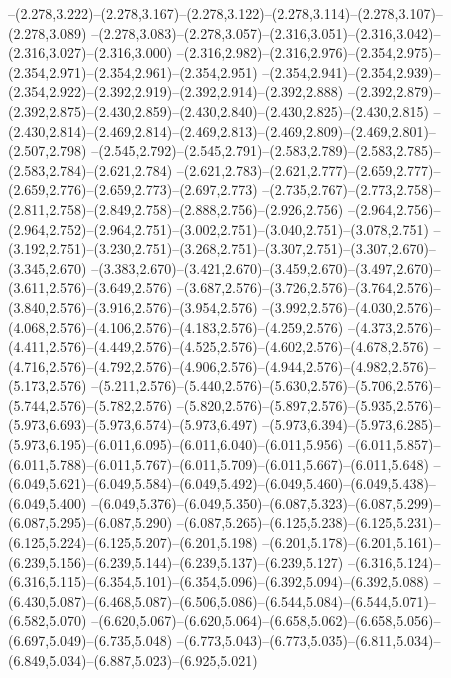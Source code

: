   --(2.278,3.222)--(2.278,3.167)--(2.278,3.122)--(2.278,3.114)--(2.278,3.107)--(2.278,3.089)%
  --(2.278,3.083)--(2.278,3.057)--(2.316,3.051)--(2.316,3.042)--(2.316,3.027)--(2.316,3.000)%
  --(2.316,2.982)--(2.316,2.976)--(2.354,2.975)--(2.354,2.971)--(2.354,2.961)--(2.354,2.951)%
  --(2.354,2.941)--(2.354,2.939)--(2.354,2.922)--(2.392,2.919)--(2.392,2.914)--(2.392,2.888)%
  --(2.392,2.879)--(2.392,2.875)--(2.430,2.859)--(2.430,2.840)--(2.430,2.825)--(2.430,2.815)%
  --(2.430,2.814)--(2.469,2.814)--(2.469,2.813)--(2.469,2.809)--(2.469,2.801)--(2.507,2.798)%
  --(2.545,2.792)--(2.545,2.791)--(2.583,2.789)--(2.583,2.785)--(2.583,2.784)--(2.621,2.784)%
  --(2.621,2.783)--(2.621,2.777)--(2.659,2.777)--(2.659,2.776)--(2.659,2.773)--(2.697,2.773)%
  --(2.735,2.767)--(2.773,2.758)--(2.811,2.758)--(2.849,2.758)--(2.888,2.756)--(2.926,2.756)%
  --(2.964,2.756)--(2.964,2.752)--(2.964,2.751)--(3.002,2.751)--(3.040,2.751)--(3.078,2.751)%
  --(3.192,2.751)--(3.230,2.751)--(3.268,2.751)--(3.307,2.751)--(3.307,2.670)--(3.345,2.670)%
  --(3.383,2.670)--(3.421,2.670)--(3.459,2.670)--(3.497,2.670)--(3.611,2.576)--(3.649,2.576)%
  --(3.687,2.576)--(3.726,2.576)--(3.764,2.576)--(3.840,2.576)--(3.916,2.576)--(3.954,2.576)%
  --(3.992,2.576)--(4.030,2.576)--(4.068,2.576)--(4.106,2.576)--(4.183,2.576)--(4.259,2.576)%
  --(4.373,2.576)--(4.411,2.576)--(4.449,2.576)--(4.525,2.576)--(4.602,2.576)--(4.678,2.576)%
  --(4.716,2.576)--(4.792,2.576)--(4.906,2.576)--(4.944,2.576)--(4.982,2.576)--(5.173,2.576)%
  --(5.211,2.576)--(5.440,2.576)--(5.630,2.576)--(5.706,2.576)--(5.744,2.576)--(5.782,2.576)%
  --(5.820,2.576)--(5.897,2.576)--(5.935,2.576)--(5.973,6.693)--(5.973,6.574)--(5.973,6.497)%
  --(5.973,6.394)--(5.973,6.285)--(5.973,6.195)--(6.011,6.095)--(6.011,6.040)--(6.011,5.956)%
  --(6.011,5.857)--(6.011,5.788)--(6.011,5.767)--(6.011,5.709)--(6.011,5.667)--(6.011,5.648)%
  --(6.049,5.621)--(6.049,5.584)--(6.049,5.492)--(6.049,5.460)--(6.049,5.438)--(6.049,5.400)%
  --(6.049,5.376)--(6.049,5.350)--(6.087,5.323)--(6.087,5.299)--(6.087,5.295)--(6.087,5.290)%
  --(6.087,5.265)--(6.125,5.238)--(6.125,5.231)--(6.125,5.224)--(6.125,5.207)--(6.201,5.198)%
  --(6.201,5.178)--(6.201,5.161)--(6.239,5.156)--(6.239,5.144)--(6.239,5.137)--(6.239,5.127)%
  --(6.316,5.124)--(6.316,5.115)--(6.354,5.101)--(6.354,5.096)--(6.392,5.094)--(6.392,5.088)%
  --(6.430,5.087)--(6.468,5.087)--(6.506,5.086)--(6.544,5.084)--(6.544,5.071)--(6.582,5.070)%
  --(6.620,5.067)--(6.620,5.064)--(6.658,5.062)--(6.658,5.056)--(6.697,5.049)--(6.735,5.048)%
  --(6.773,5.043)--(6.773,5.035)--(6.811,5.034)--(6.849,5.034)--(6.887,5.023)--(6.925,5.021)%
